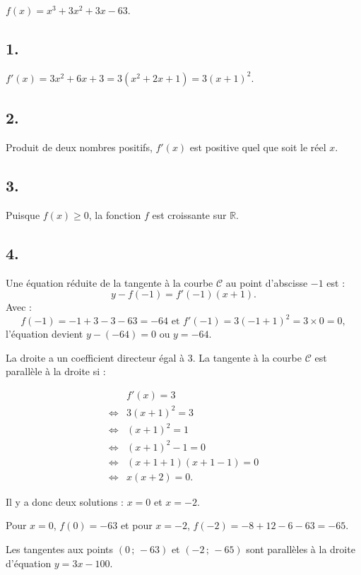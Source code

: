 \( f(x) = x^3 + 3x^2 + 3x - 63 \).

\subsection*{1.}

\(f'(x) = 3x^2 + 6x + 3 = 3(x^2 + 2x + 1) = 3(x + 1)^2\).

\subsection*{2.}

Produit de deux nombres positifs, \(f'(x)\) est positive quel que soit le réel \(x\).

\subsection*{3.}

Puisque \(f(x) \geqslant 0\), la fonction \(f\) est croissante sur \(\mathbb{R}\).

\subsection*{4.}

Une équation réduite de la tangente à la courbe \( \mathcal{C} \) au point d'abscisse \(-1\) est :
\[
y - f(-1) = f'(-1)(x + 1).
\]
Avec :
\[
f(-1) = -1 + 3 - 3 - 63 = -64 \text{ et } f'(-1) = 3(-1 + 1)^2 = 3 \times 0 = 0,
\]
l'équation devient \(y - (-64) = 0\) ou \(y = -64\).

La droite a un coefficient directeur égal à 3. La tangente à la courbe \( \mathcal{C} \) est parallèle à la droite si :

\begin{align*}
&f'(x) = 3 \\
\iff &3(x + 1)^2 = 3 \\
\iff &(x + 1)^2 = 1 \\
\iff &(x + 1)^2 - 1 = 0 \\
\iff &(x + 1 + 1)(x + 1 - 1) = 0 \\
\iff &x(x + 2) = 0.
\end{align*}

Il y a donc deux solutions : \( x = 0 \) et \( x = -2 \).

Pour \( x = 0 \), \( f(0) = -63 \) et pour \( x = -2 \), \( f(-2) = -8 + 12 - 6 - 63 = -65 \). 

Les tangentes aux points \( (0 \,;\, -63) \) et \( (-2 \,;\, -65) \) sont parallèles à la droite d'équation \( y = 3x - 100 \).
